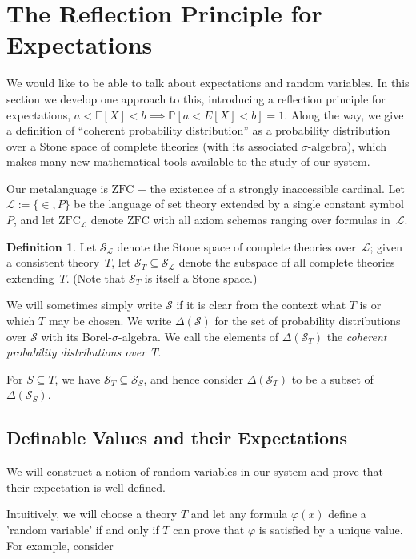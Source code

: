 \documentclass[12pt]{article}
\newcommand{\PP}{\mathbb{P}}
\newcommand{\vp}{\varphi}
\newcommand{\EE}{\mathbb{E}}
\newcommand{\zfc}{\mathrm{ZFC}}
\newcommand{\zfcl}{{\zfc_\cL}}
\newcommand{\cSL}{{\cS_\cL}}
\newcommand{\cL}{\mathcal{L}}
\newcommand{\cS}{\mathcal{S}}
\theoremstyle{plain}
\theoremstyle{definition}
\newtheorem{definition}[theorem]{Definition}
\theoremstyle{remark}
\begin{document}
\section{The Reflection Principle for Expectations}
\label{refl-exp}
We would like to be able to talk about expectations and random variables. In this section we develop one approach to this, introducing a reflection principle for expectations, $a < \EE[X] < b \implies \PP[a < E[X] < b] = 1$.
Along the way, we give a definition of ``coherent probability distribution'' as a probability distribution over a Stone space of complete theories (with its associated $\sigma$-algebra), which makes many new mathematical tools available to the study of our system.

Our metalanguage is $\zfc$ + the existence of a strongly inaccessible cardinal.
Let $\cL := \{\in,P\}$ be the language of set theory extended by a single constant symbol $P$, and let $\zfcl$ denote $\zfc$ with all axiom schemas ranging over formulas in~$\cL$.
\begin{definition}
Let $\cSL$ denote the Stone space of complete theories over~$\cL$; given a consistent theory~$T$, let $\cS_T\subseteq\cSL$ denote the subspace of all complete theories extending~$T$. (Note that $\cS_T$ is itself a Stone space.) 

We will sometimes simply write $\cS$ if it is clear from the context what $T$ is or which $T$ may be chosen.
We write $\Delta(\cS)$ for the set of probability distributions over $\cS$ with its Borel-$\sigma$-algebra. We call the elements of $\Delta(\cS_T)$ the \emph{coherent probability distributions over~$T$}.
\end{definition}
For $S\subseteq T$, we have $\cS_T\subseteq\cS_S$, and hence consider $\Delta(\cS_T)$ to be a subset of $\Delta(\cS_S)$.
\subsection{Definable Values and their Expectations}
We will construct a notion of random variables in our system and prove that their expectation is well defined.

Intuitively, we will choose a theory $T$ and let any formula $\vp(x)$ define a 'random variable' if and only if $T$ can prove that $\vp$ is satisfied by a unique value. For example, consider
\end{document}
